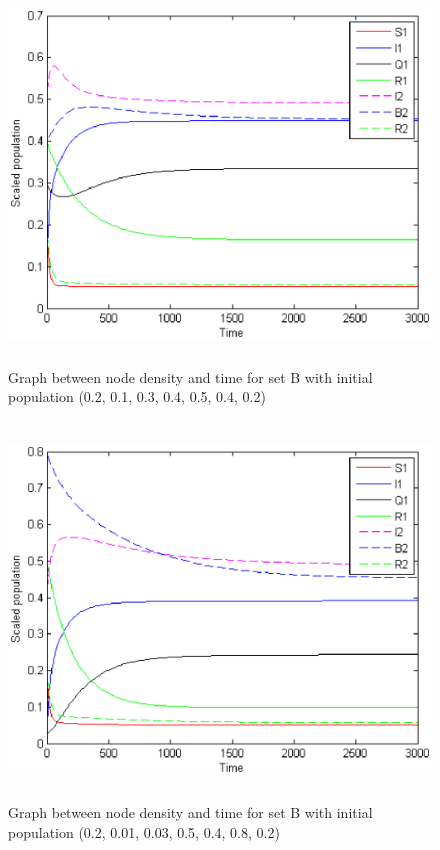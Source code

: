 \begin{figure}
\centerline{\includegraphics[width=15cm,height=10cm]{13-DR4}}
\caption{Graph between node density and time for set B with initial population (0.2, 0.1, 0.3, 0.4, 0.5, 0.4, 0.2)}
\label{fig:13-DR4}
\end{figure}
\begin{figure}
\centerline{\includegraphics[width=15cm,height=10cm]{13-DR8}}
\caption{Graph between node density and time for set B with initial population (0.2, 0.01, 0.03, 0.5, 0.4, 0.8, 0.2)}
\label{fig:13-DR8}
\end{figure}
